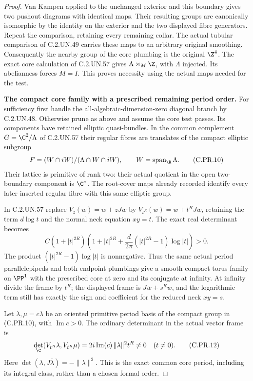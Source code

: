 \begin{proof}
Van Kampen applied to the unchanged exterior and this boundary
gives two pushout diagrams with identical maps. Their resulting
groups are canonically isomorphic by the identity on the exterior
and the two displayed fibre generators. Repeat the comparison,
retaining every remaining collar. The actual tubular comparison
of C.2.UN.49 carries these maps to an arbitrary original smoothing.
Consequently the nearby group of the core plumbing is the
original $\Z^4$. The exact core calculation of C.2.UN.57 gives
$\Lambda\rtimes_M\Z$, with $\Lambda$ injected. Its abelianness
forces $M=I$. This proves necessity using the actual maps needed
for the test.

\par\medskip\noindent\textbf{The compact core family with a prescribed remaining period order.}
For sufficiency first handle the all-algebraic-dimension-zero
diagonal branch by C.2.UN.48. Otherwise prune as above and assume
the core test passes. Its components have retained elliptic
quasi-bundles. In the common complement
$G=\C^2/\Lambda$ of C.2.UN.57 their regular fibres are translates
of the compact elliptic subgroup
\[
       F=(W\cap iW)/(\Lambda\cap W\cap iW),
                     \qquad W=\operatorname{span}_{\R}\Lambda.
                                                        \tag{C.PR.10}
\]
Their lattice is primitive of rank two: their actual quotient
in the open two-boundary component is $\C^*$.
The root-cover maps already recorded identify every later
inserted regular fibre with this same elliptic group.

In C.2.UN.57 replace $V_z(w)=w+zJ\overline w$ by
$V_{t^R}(w)=w+t^RJ\overline w$, retaining the term
$d\log t$ and the normal neck equation $xy=t$.
The exact real determinant becomes
\[
 C(1+|t|^{2R})
 \left(1+|t|^{2R}
       +\frac{d}{2\pi}(|t|^{2R}-1)\log|t|\right)>0.
                                                        \tag{C.PR.11}
\]
The product $(|t|^{2R}-1)\log|t|$ is nonnegative.
Thus the same actual period parallelepipeds and both endpoint
plumbings give a smooth compact torus family on $\PP^1$ with
the prescribed core at zero and its conjugate at infinity.
At infinity divide the frame by $t^R$; the displayed frame is
$J\overline w+s^Rw$, and the logarithmic term still has exactly
the sign and coefficient for the reduced neck $xy=s$.

Let $\lambda,\mu=c\lambda$ be an oriented primitive period basis
of the compact group in (C.PR.10), with $\operatorname{Im}c>0$.
The ordinary determinant in the actual vector frame is
\[
 \det_{\C}(V_{t^R}\lambda,V_{t^R}\mu)
       =2i\operatorname{Im}(c)\,\|\lambda\|^2 t^R\ne0
                      \quad(t\ne0).                    \tag{C.PR.12}
\]
Here $\det(\lambda,J\overline\lambda)=-\|\lambda\|^2$.
This is the exact common core period, including its integral
class, rather than a chosen formal order.


\end{proof}
